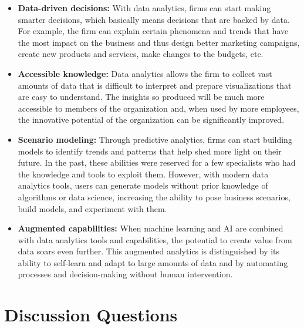 \documentclass[
  letterpaper,
  DIV=11,
  numbers=noendperiod]{scrreprt}
\begin{document}
\begin{itemize}
\item
  \textbf{Data-driven decisions:} With data analytics, firms can start
  making smarter decisions, which basically means decisions that are
  backed by data. For example, the firm can explain certain phenomena
  and trends that have the most impact on the business and thus design
  better marketing campaigns, create new products and services, make
  changes to the budgets, etc.
\item
  \textbf{Accessible knowledge:} Data analytics allows the firm to
  collect vast amounts of data that is difficult to interpret and
  prepare visualizations that are easy to understand. The insights so
  produced will be much more accessible to members of the organization
  and, when used by more employees, the innovative potential of the
  organization can be significantly improved.
\item
  \textbf{Scenario modeling:} Through predictive analytics, firms can
  start building models to identify trends and patterns that help shed
  more light on their future. In the past, these abilities were reserved
  for a few specialists who had the knowledge and tools to exploit them.
  However, with modern data analytics tools, users can generate models
  without prior knowledge of algorithms or data science, increasing the
  ability to pose business scenarios, build models, and experiment with
  them.
\item
  \textbf{Augmented capabilities:} When machine learning and AI are
  combined with data analytics tools and capabilities, the potential to
  create value from data soars even further. This augmented analytics is
  distinguished by its ability to self-learn and adapt to large amounts
  of data and by automating processes and decision-making without human
  intervention.
\end{itemize}

\hypertarget{discussion-questions-6}{%
\section{Discussion Questions}\label{discussion-questions-6}}
\end{document}
